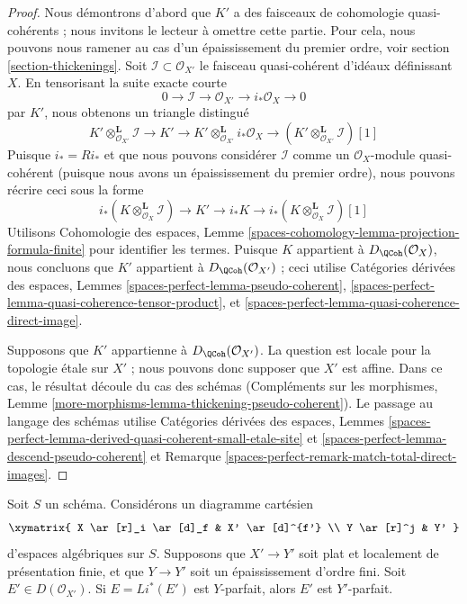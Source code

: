 \begin{proof}
Nous démontrons d'abord que $K'$ a des faisceaux de cohomologie quasi-cohérents ; nous invitons
le lecteur à omettre cette partie.
Pour cela, nous pouvons nous ramener au cas d'un épaississement du premier ordre, voir
section \ref{section-thickenings}. Soit $\mathcal{I} \subset \mathcal{O}_{X'}$
le faisceau quasi-cohérent d'idéaux définissant $X$.
En tensorisant la suite exacte courte
$$
0 \to \mathcal{I} \to \mathcal{O}_{X'} \to i_*\mathcal{O}_X \to 0
$$
par $K'$, nous obtenons un triangle distingué
$$
K' \otimes_{\mathcal{O}_{X'}}^\mathbf{L} \mathcal{I}
\to K' \to
K' \otimes_{\mathcal{O}_{X'}}^\mathbf{L} i_*\mathcal{O}_X
\to
(K' \otimes_{\mathcal{O}_{X'}}^\mathbf{L} \mathcal{I})[1]
$$
Puisque $i_* = Ri_*$ et que nous pouvons considérer $\mathcal{I}$
comme un $\mathcal{O}_X$-module quasi-cohérent (puisque nous avons un épaississement du
premier ordre), nous pouvons récrire ceci sous la forme
$$
i_*(K \otimes_{\mathcal{O}_X}^\mathbf{L} \mathcal{I})
\to K' \to
i_*K \to
i_*(K \otimes_{\mathcal{O}_X}^\mathbf{L} \mathcal{I})[1]
$$
Utilisons Cohomologie des espaces, Lemme
\ref{spaces-cohomology-lemma-projection-formula-finite}
pour identifier les termes. Puisque $K$ appartient à
$D_\QCoh(\mathcal{O}_X)$, nous concluons que
$K'$ appartient à $D_\QCoh(\mathcal{O}_{X'})$ ; ceci utilise
Catégories dérivées des espaces, Lemmes
\ref{spaces-perfect-lemma-pseudo-coherent},
\ref{spaces-perfect-lemma-quasi-coherence-tensor-product}, et
\ref{spaces-perfect-lemma-quasi-coherence-direct-image}.

\medskip\noindent
Supposons que $K'$ appartienne à $D_\QCoh(\mathcal{O}_{X'})$.
La question est locale pour la topologie \'etale sur $X'$ ;
nous pouvons donc supposer que $X'$ est affine.
Dans ce cas, le résultat découle du cas des schémas
(Compléments sur les morphismes, Lemme
\ref{more-morphisms-lemma-thickening-pseudo-coherent}).
Le passage au langage des schémas utilise
Catégories dérivées des espaces, Lemmes
\ref{spaces-perfect-lemma-derived-quasi-coherent-small-etale-site} et
\ref{spaces-perfect-lemma-descend-pseudo-coherent} et
Remarque \ref{spaces-perfect-remark-match-total-direct-images}.
\end{proof}

\begin{lemma}
\label{lemma-thickening-relatively-perfect}
Soit $S$ un schéma. Considérons un diagramme cartésien
$$
\xymatrix{
X \ar[r]_i \ar[d]_f & X' \ar[d]^{f'} \\
Y \ar[r]^j & Y'
}
$$
d'espaces algébriques sur $S$. Supposons que $X' \to Y'$ soit plat et localement
de présentation finie, et que $Y \to Y'$ soit un épaississement d'ordre fini.
Soit $E' \in D(\mathcal{O}_{X'})$. Si $E = Li^*(E')$ est $Y$-parfait,
alors $E'$ est $Y'$-parfait.
\end{lemma}

